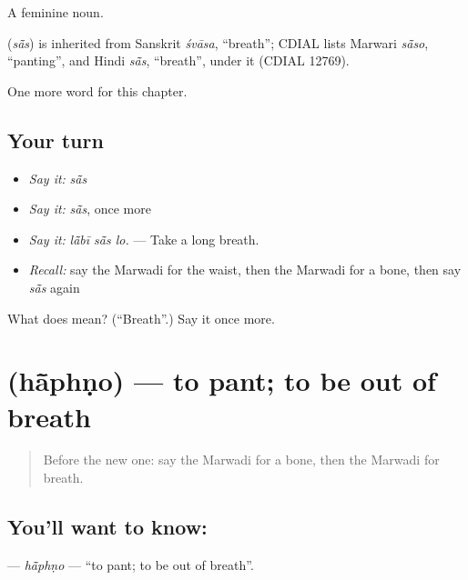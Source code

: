 A feminine noun.

\begin{cousinweb}
\textbf{} (\emph{sā̃s}) is inherited from Sanskrit \emph{śvāsa}, \textquotedblleft{}breath\textquotedblright{}; CDIAL lists Marwari \emph{sā̃so}, \textquotedblleft{}panting\textquotedblright{}, and Hindi \emph{sā̃s}, \textquotedblleft{}breath\textquotedblright{}, under it (CDIAL 12769).
\end{cousinweb}

\begin{grammarlens}[title={What you've built}]
One more word for this chapter.
\end{grammarlens}

\subsection*{Your turn}
\begin{itemize}
\raggedright
  \item \emph{Say it:} \emph{sā̃s}
  \item \emph{Say it:} \emph{sā̃s}, once more
  \item \emph{Say it:} \emph{lā̃bī sā̃s lo.} — Take a long breath.
  \item \emph{Recall:} say the Marwadi for the waist, then the Marwadi for a bone, then say \emph{sā̃s} again
\end{itemize}

\begin{tcolorbox}[breakable,colback=teal!4,colframe=teal!35!black,title={Before you move on}]
What does  mean? (\textquotedblleft{}Breath\textquotedblright{}.) Say it once more.
\end{tcolorbox}
\section[\texorpdfstring{\mw{हांफणो} (hā̃phṇo)}{हांफणो (hā̃phṇo)}]{ (hā̃phṇo) — to pant; to be out of breath}

\label{lesson:MW-C252-haphno}



\begin{quote}
Before the new one: say the Marwadi for a bone, then the Marwadi for breath.
\end{quote}

\subsection*{You'll want to know: }
\textbf{} — \emph{hā̃phṇo} — \textquotedblleft{}to pant; to be out of breath\textquotedblright{}.

